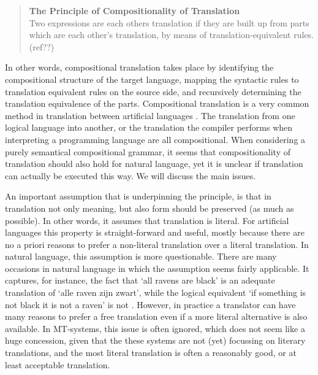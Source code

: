 \documentclass{report}
\theoremstyle{break}
\begin{document}
\begin{quote}
\textbf{The Principle of Compositionality of Translation}\\
Two expressions are each others translation if they are built up from parts which are each other's translation, by means of translation-equivalent rules. (ref??)
\end{quote}

In other words, compositional translation takes place by identifying the compositional structure of the target language, mapping the syntactic rules to translation equivalent rules on the source side, and recursively determining the translation equivalence of the parts. Compositional translation is a very common method in translation between artificial languages \citep{janssen1996compositionality,janssen1998algebraic}. The translation from one logical language into another, or the translation the compiler performs when interpreting a programming language are all compositional. When considering a purely semantical compositional grammar, it seems that compositionality of translation should also hold for natural language, yet it is unclear if translation can actually be executed this way. We will discuss the main issues.

An important assumption that is underpinning the principle, is that in translation not only meaning, but also form should be preserved (as much as possible). In other words, it assumes that translation is literal. For artificial languages this property is straight-forward and useful, mostly because there are no a priori reasons to prefer a non-literal translation over a literal translation. In natural language, this assumption is more questionable. There are many occasions in natural language in which the assumption seems fairly applicable. It captures, for instance, the fact that `all ravens are black' is an adequate translation of `alle raven zijn zwart', while the logical equivalent `if something is not black it is not a raven' is not \citep{landsbergen1989power}. However, in practice a translator can have many reasons to prefer a free translation even if a more literal alternative is also available. In MT-systems, this issue is often ignored, which does not seem like a huge concession, given that the these systems are not (yet) focussing on literary translations, and the most literal translation is often a reasonably good, or at least acceptable translation.
\end{document}
